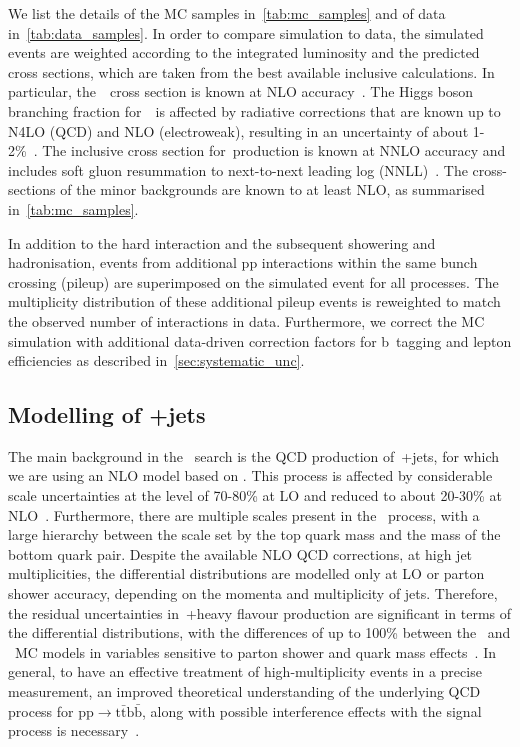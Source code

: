 We list the details of the MC samples in~\cref{tab:mc_samples} and of data in~\cref{tab:data_samples}. In order to compare simulation to data, the simulated events are weighted according to the integrated luminosity and the predicted cross sections, which are taken from the best available inclusive calculations. In particular, the~\ttH~cross section is known at NLO accuracy~\cite{Dittmaier:1318996,Beenakker:2001rj,Beenakker:2002nc,Dawson:2002tg,Dawson:2003zu}. The Higgs boson branching fraction for~\Hbb~is affected by radiative corrections that are known up to N4LO (QCD) and NLO (electroweak), resulting in an uncertainty of about 1-2\%~\cite{Djouadi:1997yw,Butterworth:2010ym,deFlorian:2016spz}.
The inclusive cross section for~\ttbar production is known at NNLO accuracy and includes soft gluon resummation to next-to-next leading log (NNLL)~\cite{Czakon:2011xx}. The cross-sections of the minor backgrounds are known to at least NLO, as summarised in~\cref{tab:mc_samples}.

In addition to the hard interaction and the subsequent showering and hadronisation, events from additional pp interactions within the same bunch crossing (pileup) are superimposed on the simulated event for all processes. The multiplicity distribution of these additional pileup events is reweighted to match the observed number of interactions in data. Furthermore, we correct the MC simulation with additional data-driven correction factors for b~tagging and lepton efficiencies as described in~\cref{sec:systematic_unc}.


\subsection{Modelling of \ttbar+jets}
\label{sec:ttbar_subprocesses}
The main background in the \ttHbb~search is the QCD production of~\ttbar+jets, for which we are using an NLO model based on \powheg. This process is affected by considerable scale uncertainties at the level of 70-80\% at LO and reduced to about 20-30\% at NLO~\cite{deFlorian:2016spz}. Furthermore, there are multiple scales present in the \ttbb~process, with a large hierarchy between the scale set by the top quark mass and the mass of the bottom quark pair. Despite the available NLO QCD corrections, at high jet multiplicities, the differential distributions are modelled only at LO or parton shower accuracy, depending on the momenta and multiplicity of jets. Therefore, the residual uncertainties in~\ttbar+heavy flavour production are significant in terms of the differential distributions, with the differences of up to 100\% between the \powheg\ and \madgraphatnlo\ MC models in variables sensitive to parton shower and quark mass effects~\cite{deFlorian:2016spz}. In general, to have an effective treatment of high-multiplicity events in a precise~\ttHbb\xspace measurement, an improved theoretical understanding of the underlying QCD process for $\mathrm{pp} \rightarrow \mathrm{t\bar{t}b\bar{b}}$, along with possible interference effects with the signal process is necessary~\cite{Denner:2014wka}.

